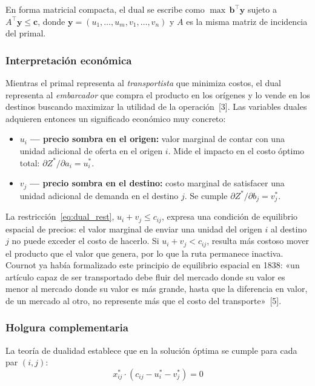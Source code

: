 \documentclass[10pt,letterpaper,twocolumn]{article}
\begin{document}
En forma matricial compacta, el dual se escribe como
$\max\, \mathbf{b}^{\top}\mathbf{y}$ sujeto a $A^{\top}\mathbf{y} \leq \mathbf{c}$, donde $\mathbf{y} = (u_1,\ldots,u_m, v_1,\ldots,v_n)$ y $A$ es la misma matriz de incidencia del primal.

\subsubsection{Interpretación económica}
Mientras el primal representa al \emph{transportista} que minimiza costos, el dual representa al \emph{embarcador} que compra el producto en los orígenes y lo vende en los destinos buscando maximizar la utilidad de la operación~[3]. Las variables duales adquieren entonces un significado económico muy concreto:

\begin{itemize}
\item $u_i$ \textbf{--- precio sombra en el origen:} valor marginal de contar con una unidad adicional de oferta en el origen $i$. Mide el impacto en el costo óptimo total: $\partial Z^*/\partial a_i = u_i^*$.
\item $v_j$ \textbf{--- precio sombra en el destino:} costo marginal de satisfacer una unidad adicional de demanda en el destino $j$. Se cumple $\partial Z^*/\partial b_j = v_j^*$.
\end{itemize}

La restricción~\eqref{eq:dual_rest}, $u_i + v_j \leq c_{ij}$, expresa una condición de equilibrio espacial de precios: el valor marginal de enviar una unidad del origen $i$ al destino $j$ no puede exceder el costo de hacerlo. Si $u_i + v_j < c_{ij}$, resulta más costoso mover el producto que el valor que genera, por lo que la ruta permanece inactiva. Cournot ya había formalizado este principio de equilibrio espacial en 1838: «un artículo capaz de ser transportado debe fluir del mercado donde su valor es menor al mercado donde su valor es más grande, hasta que la diferencia en valor, de un mercado al otro, no represente más que el costo del transporte»~[5].

\subsubsection{Holgura complementaria}
La teoría de dualidad establece que en la solución óptima se cumple para cada par $(i, j)$:
\begin{equation}
x_{ij}^* \cdot (c_{ij} - u_i^* - v_j^*) = 0 \label{eq:holgura}
\end{equation}
\end{document}
